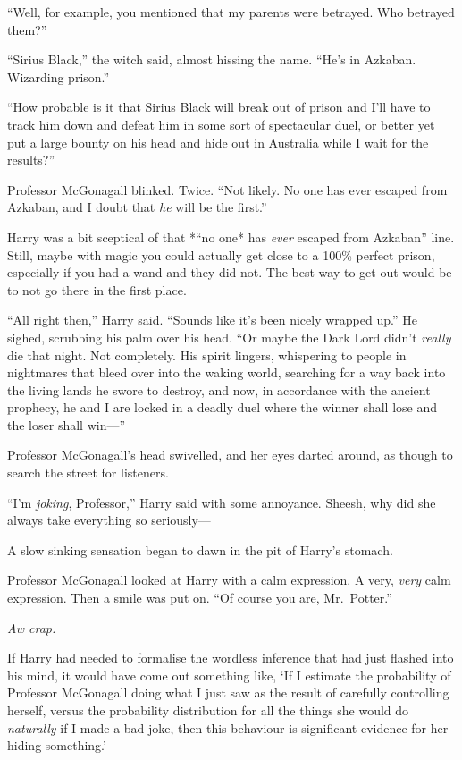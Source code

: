 ``Well, for example, you mentioned that my parents were betrayed. Who
betrayed them?''

``Sirius Black,'' the witch said, almost hissing the name. ``He's in
Azkaban. Wizarding prison.''

``How probable is it that Sirius Black will break out of prison and I'll
have to track him down and defeat him in some sort of spectacular duel,
or better yet put a large bounty on his head and hide out in Australia
while I wait for the results?''

Professor McGonagall blinked. Twice. ``Not likely. No one has ever
escaped from Azkaban, and I doubt that \emph{he} will be the first.''

Harry was a bit sceptical of that *``no one* has \emph{ever} escaped
from Azkaban'' line. Still, maybe with magic you could actually get
close to a 100\% perfect prison, especially if you had a wand and they
did not. The best way to get out would be to not go there in the first
place.

``All right then,'' Harry said. ``Sounds like it's been nicely wrapped
up.'' He sighed, scrubbing his palm over his head. ``Or maybe the Dark
Lord didn't \emph{really} die that night. Not completely. His spirit
lingers, whispering to people in nightmares that bleed over into the
waking world, searching for a way back into the living lands he swore to
destroy, and now, in accordance with the ancient prophecy, he and I are
locked in a deadly duel where the winner shall lose and the loser shall
win---''

Professor McGonagall's head swivelled, and her eyes darted around, as
though to search the street for listeners.

``I'm \emph{joking}, Professor,'' Harry said with some annoyance.
Sheesh, why did she always take everything so seriously---

A slow sinking sensation began to dawn in the pit of Harry's stomach.

Professor McGonagall looked at Harry with a calm expression. A very,
\emph{very} calm expression. Then a smile was put on. ``Of course you
are, Mr.~Potter.''

\emph{Aw crap.}

If Harry had needed to formalise the wordless inference that had just
flashed into his mind, it would have come out something like, `If I
estimate the probability of Professor McGonagall doing what I just saw
as the result of carefully controlling herself, versus the probability
distribution for all the things she would do \emph{naturally} if I made
a bad joke, then this behaviour is significant evidence for her hiding
something.'

